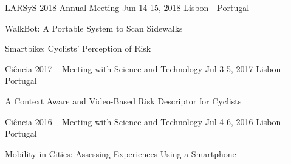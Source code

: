 \begin{cventries}

  \cventrypresentation
    {LARSyS 2018 Annual Meeting} %
    {Jun 14-15, 2018} %
    {Lisbon - Portugal} %
    {
      \begin{cvpresentationitems} %
        \item {} {WalkBot: A Portable System to Scan Sidewalks}
        \item {} {Smartbike: Cyclists’ Perception of Risk}
      \end{cvpresentationitems}
    }


  \cventrypresentation
    {Ciência 2017 – Meeting with Science and Technology} %
    {Jul 3-5, 2017} %
    {Lisbon - Portugal} %
    {
      \begin{cvpresentationitems} %
        \item {} {A Context Aware and Video-Based Risk Descriptor for Cyclists}
      \end{cvpresentationitems}
    }


  \cventrypresentation
    {Ciência 2016 – Meeting with Science and Technology} %
    {Jul 4-6, 2016} %
    {Lisbon - Portugal} %
    {
      \begin{cvpresentationitems} %
        \item {} {Mobility in Cities: Assessing Experiences Using a Smartphone}
      \end{cvpresentationitems}
    }

  

\end{cventries}
